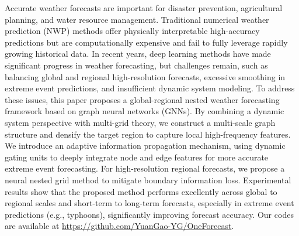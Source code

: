 Accurate weather forecasts are important for disaster prevention, agricultural planning, and water resource management. Traditional numerical weather prediction (NWP) methods offer physically interpretable high-accuracy predictions but are computationally expensive and fail to fully leverage rapidly growing historical data. In recent years, deep learning methods have made significant progress in weather forecasting, but challenges remain, such as balancing global and regional high-resolution forecasts, excessive smoothing in extreme event predictions, and insufficient dynamic system modeling. To address these issues, this paper proposes a global-regional nested weather forecasting framework based on graph neural networks (GNNs). By combining a dynamic system perspective with multi-grid theory, we construct a multi-scale graph structure and densify the target region to capture local high-frequency features. We introduce an adaptive information propagation mechanism, using dynamic gating units to deeply integrate node and edge features for more accurate extreme event forecasting. For high-resolution regional forecasts, we propose a neural nested grid method to mitigate boundary information loss. Experimental results show that the proposed method performs excellently across global to regional scales and short-term to long-term forecasts, especially in extreme event predictions (e.g., typhoons), significantly improving forecast accuracy. Our codes are available at \url{https://github.com/YuanGao-YG/OneForecast}.
